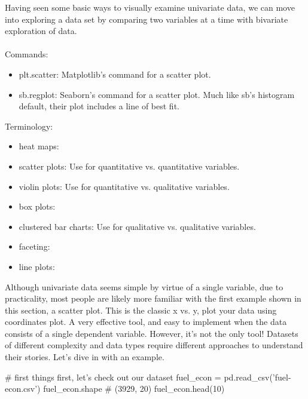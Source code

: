 Having seen some basic ways to visually examine univariate data, we can move into exploring a data set by comparing two variables at a time with bivariate exploration of data.
\\\\
Commands:
\begin{itemize}
	\item plt.scatter: Matplotlib's command for a scatter plot.
	\item sb.regplot: Seaborn's command for a scatter plot. Much like sb's histogram default, their plot includes a line of best fit.
\end{itemize}

Terminology:
\begin{itemize}
	\item heat maps:
	\item scatter plots: Use for quantitative vs. quantitative variables.
	\item violin plots: Use for quantitative vs. qualitative variables.
	\item box plots:
	\item clustered bar charts: Use for qualitative vs. qualitative variables.
	\item faceting:
	\item line plots:
\end{itemize}

Although univariate data seems simple by virtue of a single variable, due to practicality, most people are likely more familiar with the first example shown in this section, a scatter plot. This is the classic x vs. y, plot your data using coordinates plot. A very effective tool, and easy to implement when the data consists of a single dependent variable. However, it's not the only tool! Datasets of different complexity and data types require different approaches to understand their stories. Let's dive in with an example.

\begin{python}
	# first things first, let's check out our dataset
	fuel_econ = pd.read_csv('fuel-econ.csv')
	fuel_econ.shape
	# (3929, 20)
	fuel_econ.head(10)
\end{python}

